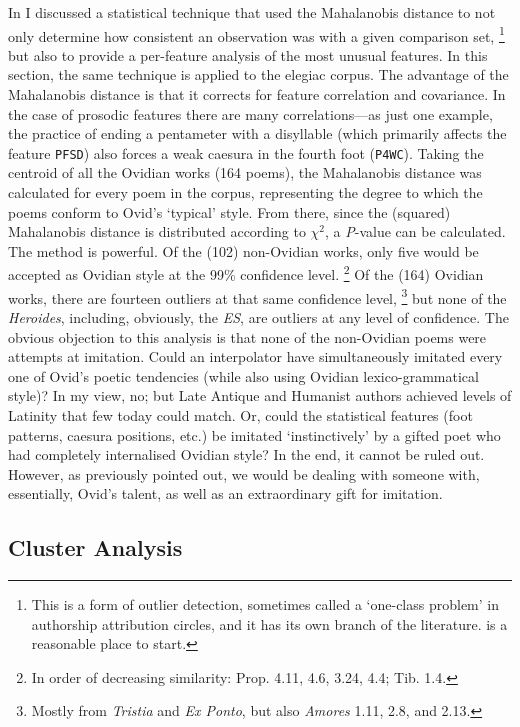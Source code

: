 \documentclass[twocolumn, switch, a4paper]{article} %
\begin{document}
In  I discussed a statistical technique that
used the Mahalanobis distance to not only determine how consistent an
observation was with a given comparison set,%
%
    \footnote{This is a form of outlier detection, sometimes called a
    `one-class problem' in authorship attribution circles, and it has its own
    branch of the literature.  is a reasonable
    place to start.}
%
but also to provide a per-feature analysis of the most unusual features. In
this section, the same technique is applied to the elegiac corpus. The
advantage of the Mahalanobis distance is that it corrects for feature
correlation and covariance. In the case of prosodic features there are many
correlations---as just one example, the practice of ending a pentameter with a
disyllable (which primarily affects the feature \texttt{PFSD}) also forces a
weak caesura in the fourth foot (\texttt{P4WC}). Taking the centroid of all
the Ovidian works (164 poems), the Mahalanobis distance was calculated for
every poem in the corpus, representing the degree to which the poems conform
to Ovid's `typical' style. From there, since the (squared) Mahalanobis
distance is distributed according to $\chi^2$, a \emph{P}-value can be
calculated. The method is powerful. Of the (102) non-Ovidian works, only five
would be accepted as Ovidian style at the 99\% confidence level.%
%
    \footnote{In order of decreasing similarity: Prop. 4.11, 4.6, 3.24, 4.4;
    Tib. 1.4.}
%
Of the (164) Ovidian works, there are fourteen outliers at that same
confidence level,%
%
    \footnote{Mostly from \emph{Tristia} and \emph{Ex Ponto}, but also
    \emph{Amores} 1.11, 2.8, and 2.13.}
%
but none of the \emph{Heroides}, including, obviously, the \emph{ES}, are
outliers at any level of confidence. The obvious objection to this analysis is
that none of the non-Ovidian poems were attempts at imitation. Could an
interpolator have simultaneously imitated every one of Ovid's poetic
tendencies (while also using Ovidian lexico-grammatical style)? In my view,
no; but Late Antique and Humanist authors achieved levels of Latinity that few
today could match. Or, could the statistical features (foot patterns, caesura
positions, etc.) be imitated `instinctively' by a gifted poet who had
completely internalised Ovidian style? In the end, it cannot be ruled out.
However, as previously pointed out, we would be dealing with someone with,
essentially, Ovid's talent, as well as an extraordinary gift for imitation.

\subsection{Cluster Analysis}
\end{document}
